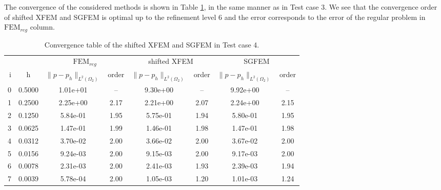 The convergence of the considered methods is shown in Table \ref{tab:convergence_test4}, in the same manner as in Test case 3.
We see that the convergence order of shifted XFEM and SGFEM is optimal up to the refinement level 6 and the error corresponds to
the error of the regular problem in $\textrm{FEM}_{reg}$ column. 
%
\begin{table}[!htb]
\begin{center}
\bgroup
\def\arraystretch{1.2}
\setlength\tabcolsep{5pt}
\begin{tabular}{rc|cc|cc|cc}
\toprule
\multicolumn{2}{c|}{} & \multicolumn{2}{c|}{$\textrm{FEM}_{reg}$} & \multicolumn{2}{c|}{shifted XFEM} & \multicolumn{2}{c}{SGFEM}\\ [3pt] %
i & h & $\|p-p_h\|_{L^2(\Omega_2)}$ & order & $\|p-p_h\|_{L^2(\Omega_2)}$ & order & $\|p-p_h\|_{L^2(\Omega_2)}$ & order \\ [3pt] \midrule
0 & 0.5000 & 1.01e+01 & --   & 9.30e+00 & --   & 9.92e+00 & --   \\ %
1 & 0.2500 & 2.25e+00 & 2.17 & 2.21e+00 & 2.07 & 2.24e+00 & 2.15 \\ %
2 & 0.1250 & 5.84e-01 & 1.95 & 5.75e-01 & 1.94 & 5.80e-01 & 1.95 \\ %
3 & 0.0625 & 1.47e-01 & 1.99 & 1.46e-01 & 1.98 & 1.47e-01 & 1.98 \\ %
4 & 0.0312 & 3.70e-02 & 2.00 & 3.66e-02 & 2.00 & 3.67e-02 & 2.00 \\ %
5 & 0.0156 & 9.24e-03 & 2.00 & 9.15e-03 & 2.00 & 9.17e-03 & 2.00 \\ %
6 & 0.0078 & 2.31e-03 & 2.00 & 2.41e-03 & 1.93 & 2.39e-03 & 1.94 \\ %
7 & 0.0039 & 5.78e-04 & 2.00 & 1.05e-03 & 1.20 & 1.01e-03 & 1.24 \\ %
\bottomrule
\end{tabular}
\egroup
\caption{Convergence table of the shifted XFEM and SGFEM in Test case 4.}
\label{tab:convergence_test4}
\end{center}
\end{table}


